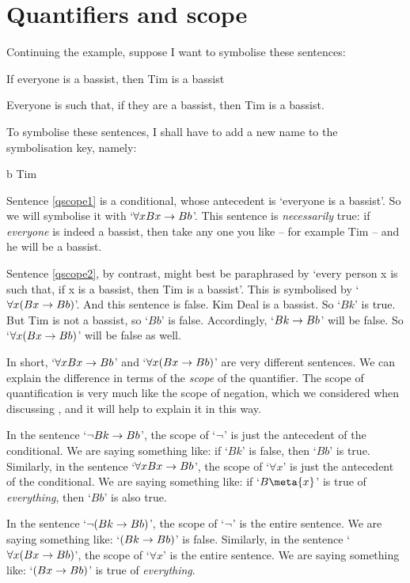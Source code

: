 \section{Quantifiers and scope}
Continuing the example, suppose I want to symbolise these sentences:
	\begin{earg}
		\item[\ex{qscope1}] If everyone is a bassist, then Tim is a bassist
		\item[\ex{qscope2}] Everyone is such that, if they are a bassist, then Tim is a bassist.
	\end{earg}
To symbolise these sentences, I shall have to add a new name to the symbolisation key, namely:
	\begin{ekey}
		\item[b] Tim
	\end{ekey}
Sentence \ref{qscope1} is a conditional, whose antecedent is `everyone is a bassist'. So we will symbolise it with `$\forall x Bx \rightarrow Bb$'. This sentence is \emph{necessarily} true: if \emph{everyone} is indeed a bassist, then take any one you like – for example Tim – and he will be a bassist. 

Sentence \ref{qscope2}, by contrast, might best be paraphrased by `every person x is such that, if x is a bassist, then Tim is a bassist'. This is symbolised by `$\forall x (Bx \rightarrow Bb)$'. And this sentence is false. Kim Deal is a bassist. So `$Bk$' is true. But Tim is not a bassist, so `$Bb$' is false. Accordingly, `$Bk \rightarrow Bb$' will be false. So `$\forall x (Bx \rightarrow Bb)$' will be false as well. 

In short, `$\forall x Bx \rightarrow Bb$' and `$\forall x (Bx \rightarrow Bb)$' are very different sentences. We can explain the difference in terms of the \emph{scope} of the quantifier. The scope of quantification is very much like the scope of negation, which we considered when discussing \TFL, and it will help to explain it in this way.

In the sentence `$\neg Bk \rightarrow Bb$', the scope of `$\neg$' is just the antecedent of the conditional. We are saying something like: if `$Bk$' is false, then `$Bb$' is true. Similarly, in the sentence `$\forall x Bx \rightarrow Bb$', the scope of `$\forall x$' is just the antecedent of the conditional. We are saying something like: if `$B\meta{x}$' is true of \emph{everything}, then `$Bb$' is also true. 

In the sentence `$\neg(Bk \rightarrow Bb)$', the scope of `$\neg$' is the entire sentence. We are saying something like: `$(Bk \rightarrow Bb)$' is false. Similarly, in the sentence `$\forall x (Bx \rightarrow Bb)$', the scope of `$\forall x$' is the entire sentence. We are saying something like: `$(Bx \rightarrow Bb)$' is true of \emph{everything}.


